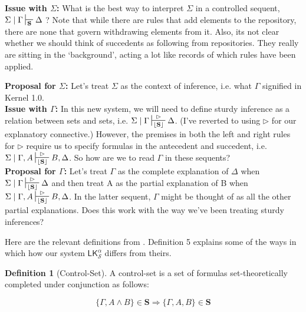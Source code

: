\documentclass{article}                     %
\theoremstyle{theorem}
\theoremstyle{corollary}
\theoremstyle{lemma}
\theoremstyle{definition}
\newtheorem{definition}[section]{Definition}
\theoremstyle{remark}
\theoremstyle{definition}
\theoremstyle{notation}
\theoremstyle{definition}
\theoremstyle{proposition}
\theoremstyle{definition}
\begin{document}
\begin{framed}

\noindent\textbf{Issue with $ \Sigma $:}
What is the best way to interpret $ \Sigma $ in a controlled sequent, $\Sigma\mid\Gamma\sststile{\mathbf{S}}{}\Delta $ ? Note that while there are rules that add elements to the repository, there are none that govern withdrawing elements from it. Also, its not clear whether we should think of succedents as following from repositories. They really are sitting in the `background', acting a lot like records of which rules have been applied.

\textbf{Proposal for $ \Sigma $:} Let's treat $ \Sigma $ as the context of inference, i.e. what $ \Gamma $ signified in Kernel 1.0.\\

\noindent\textbf{Issue with $ \Gamma $:} In this new system, we will need to define sturdy inference as a relation between sets and sets, i.e. $ \Sigma\mid\Gamma\sststile{\mathbf{\lfloor\mathbf{S}\rfloor}}{\rhd} \Delta $. (I've reverted to using $ \rhd $ for our explanatory connective.) However, the premises in both the left and right rules for $ \rhd $ require us to specify formulas in the antecedent and succedent, i.e. $ \Sigma\mid\Gamma, A\sststile{\mathbf{\lfloor\mathbf{S}\rfloor}}{\rhd} B, \Delta $. So how are we to read $ \Gamma  $ in these sequents?\\

\textbf{Proposal for $ \Gamma $:} Let's treat $ \Gamma $ as the complete explanation of $ \Delta $ when $ \Sigma\mid\Gamma\sststile{\mathbf{\lfloor\mathbf{S}\rfloor}}{\rhd} \Delta $ and then treat A as the partial explanation of B when $ \Sigma\mid\Gamma, A\sststile{\mathbf{\lfloor\mathbf{S}\rfloor}}{\rhd} B, \Delta $. In the latter sequent, $ \Gamma $ might be thought of as all the other partial explanations. Does this work with the way we've been treating sturdy inferences?

\end{framed}




\vspace{3mm}

Here are the relevant definitions from \textcite{Piazza2015}. Definition 5 explains some of the ways in which how our system $\mathsf{LK}^\alpha_\mathcal{S} $ differs from theirs.


\begin{definition}[Control-Set]
A control-set is a set of formulas set-theoretically completed under conjunction as follows:

$$ \{\Gamma, A \wedge B\} \in \mathbf{S} \Rightarrow \{\Gamma, A, B\} \in \mathbf{S}$$ 
\end{definition}
\end{document}
